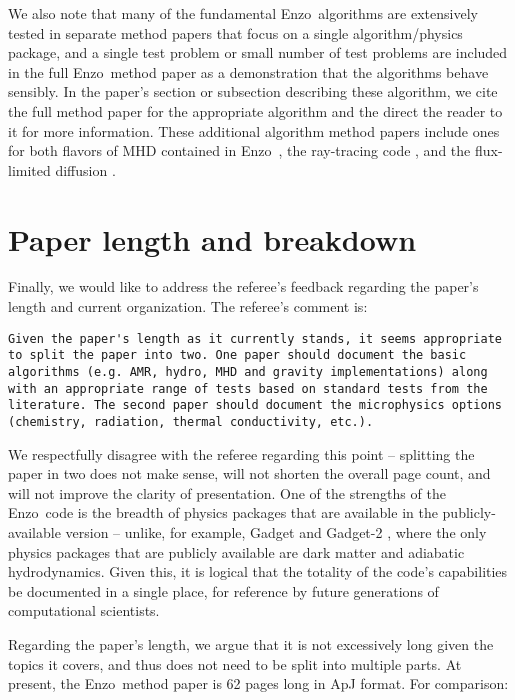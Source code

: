\documentclass[11pt]{article}
\newcommand{\code}[1]{\textsf{#1}}
\newcommand{\enzo}{\code{Enzo}}
\begin{document}
We also note that many of the fundamental \enzo\ algorithms are
extensively tested in separate method papers that focus on a single
algorithm/physics package, and a single test problem or small number
of test problems are included in the full \enzo\ method paper as a
demonstration that the algorithms behave sensibly.  In the paper's
section or subsection
describing these algorithm, we cite the full method paper for the
appropriate algorithm and the direct the reader to it for more
information.  These additional algorithm method papers include ones
for both flavors of MHD contained in \enzo\ \citep{Wang:2009a,
Collins10}, the ray-tracing code \citep{Wise11_Moray}, and the
flux-limited diffusion \citep{ReynoldsHayesPaschosNorman2009}.

\section{Paper length and breakdown}

Finally, we would like to address the referee's feedback regarding the
paper's length and current organization.  The referee's comment is:

\begin{verbatim} 
Given the paper's length as it currently stands, it seems appropriate
to split the paper into two. One paper should document the basic
algorithms (e.g. AMR, hydro, MHD and gravity implementations) along
with an appropriate range of tests based on standard tests from the
literature. The second paper should document the microphysics options
(chemistry, radiation, thermal conductivity, etc.).
\end{verbatim}

We respectfully disagree with the referee regarding this point --
splitting the paper in two does not make sense, will not shorten the
overall page count, and will not improve the clarity of presentation. One of the strengths
of the \enzo\ code is the breadth of physics packages that are
available in the publicly-available version -- unlike, for example,
Gadget and Gadget-2 \citep{2001NewA....6...79S, 2005MNRAS.364.1105S},
where the only physics packages that are publicly available are dark
matter and adiabatic hydrodynamics.  Given this, it is logical that
the totality of the code's capabilities be documented in a single
place, for reference by future generations of computational scientists.

Regarding the paper's length, we argue that it is not excessively long
given the topics it covers, and thus does not need to be split into
multiple parts.  At present, the \enzo\ method paper is 62 pages long
in ApJ format.
For comparison:
\end{document}
